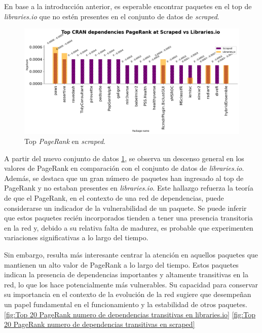 En base a la introducción anterior, es esperable encontrar paquetes en el top de \textit{libraries.io}
que no estén presentes en el conjunto de datos de \textit{scraped}.

\begin{figure}[h!]
    \begin{center}
        \includegraphics[width=1\textwidth]{img/cran/pr_top2.png}
        \caption{Top \textit{PageRank} en \textit{scraped}.}
        \label{fig:cran_pr_scraped_top}
    \end{center}
\end{figure}

A partir del nuevo conjunto de datos \ref{fig:cran_pr_scraped_top}, se observa un descenso general en los
valores de PageRank en comparación con el conjunto de datos de \textit{libraries.io}. Además, se destaca
que un gran número de paquetes han ingresado al top de PageRank y no estaban presentes en \textit{libraries.io}.
Este hallazgo refuerza la teoría de que el PageRank, en el contexto de una red de dependencias, puede
considerarse un indicador de la vulnerabilidad de un paquete. Se puede inferir que estos paquetes recién
incorporados tienden a tener una presencia transitoria en la red y, debido a su relativa falta de madurez,
es probable que experimenten variaciones significativas a lo largo del tiempo.

Sin embargo, resulta más interesante centrar la atención en aquellos paquetes que mantienen un alto valor de
PageRank a lo largo del tiempo. Estos paquetes indican la presencia de dependencias importantes y altamente
transitivas en la red, lo que los hace potencialmente más vulnerables. Su capacidad para conservar su
importancia en el contexto de la evolución de la red sugiere que desempeñan un papel fundamental en el
funcionamiento y la estabilidad de otros paquetes. \ref{fig:Top 20 PageRank numero de dependencias transitivas en libraries.io}
\ref{fig:Top 20 PageRank numero de dependencias transitivas en scraped}

